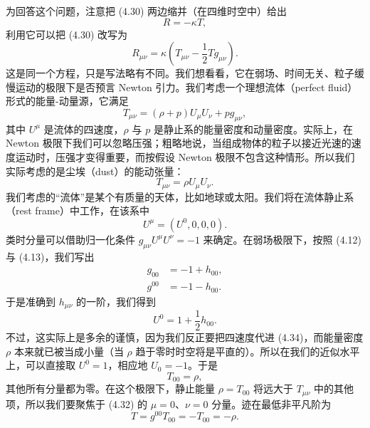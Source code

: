 为回答这个问题，注意把 (4.30) 两边缩并（在四维时空中）给出
\begin{equation*}
R = -\kappa T,
\tag{4.31}
\end{equation*}
利用它可以把 (4.30) 改写为
\begin{equation*}
R_{\mu\nu} = \kappa\left(T_{\mu\nu} - \frac{1}{2}Tg_{\mu\nu}\right).
\tag{4.32}
\end{equation*}
这是同一个方程，只是写法略有不同。我们想看看，它在弱场、时间无关、粒子缓慢运动的极限下是否预言 Newton 引力。我们考虑一个理想流体（perfect fluid）形式的能量-动量源，它满足
\begin{equation*}
T_{\mu\nu} = (\rho+p)U_\mu U_\nu + pg_{\mu\nu},
\tag{4.33}
\end{equation*}
其中 $U^\mu$ 是流体的四速度，$\rho$ 与 $p$ 是静止系的能量密度和动量密度。实际上，在 Newton 极限下我们可以忽略压强；粗略地说，当组成物体的粒子以接近光速的速度运动时，压强才变得重要，而按假设 Newton 极限不包含这种情形。所以我们实际考虑的是尘埃（dust）的能动张量：
\begin{equation*}
T_{\mu\nu} = \rho U_\mu U_\nu.
\tag{4.34}
\end{equation*}
我们考虑的“流体”是某个有质量的天体，比如地球或太阳。我们将在流体静止系（rest frame）中工作，在该系中
\begin{equation*}
U^\mu = (U^0, 0, 0, 0).
\tag{4.35}
\end{equation*}
类时分量可以借助归一化条件 $g_{\mu\nu}U^\mu U^\nu=-1$ 来确定。在弱场极限下，按照 (4.12) 与 (4.13)，我们写出
\begin{align*}
g_{00} &= -1 + h_{00}, \\
g^{00} &= -1 - h_{00}.
\tag{4.36}
\end{align*}
于是准确到 $h_{\mu\nu}$ 的一阶，我们得到
\begin{equation*}
U^0 = 1 + \frac{1}{2}h_{00}.
\tag{4.37}
\end{equation*}
不过，这实际上是多余的谨慎，因为我们反正要把四速度代进 (4.34)，而能量密度 $\rho$ 本来就已被当成小量（当 $\rho$ 趋于零时时空将是平直的）。所以在我们的近似水平上，可以直接取 $U^0=1$，相应地 $U_0=-1$。于是
\begin{equation*}
T_{00} = \rho,
\tag{4.38}
\end{equation*}
其他所有分量都为零。在这个极限下，静止能量 $\rho=T_{00}$ 将远大于 $T_{\mu\nu}$ 中的其他项，所以我们要聚焦于 (4.32) 的 $\mu=0$、$\nu=0$ 分量。迹在最低非平凡阶为
\begin{equation*}
T = g^{00}T_{00} = -T_{00} = -\rho.
\tag{4.39}
\end{equation*}

